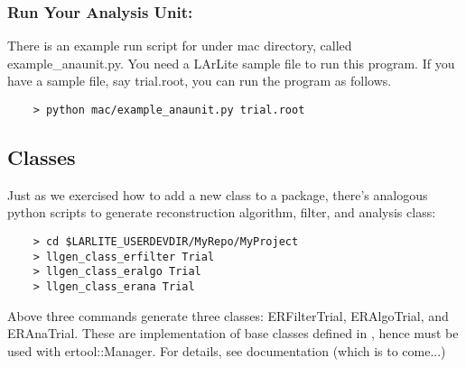 \subsubsection{Run Your Analysis Unit: \PyROOT}
\label{sec:yourrunscript}
There is an example \python run script for \anaunit under {\ttfamily mac} directory, called 
{\ttfamily example\_anaunit.py}. You need a LArLite sample \ROOT file to run this program. 
If you have a sample file, say {\ttfamily trial.root}, you can run the program as follows.
\begin{lstlisting}
    > python mac/example_anaunit.py trial.root
\end{lstlisting}

\subsection{\ertool Classes}
Just as we exercised how to add a new \CPP class to a package, there's analogous python scripts to
generate \ertool reconstruction algorithm, filter, and analysis class:
\begin{lstlisting}
    > cd $LARLITE_USERDEVDIR/MyRepo/MyProject
    > llgen_class_erfilter Trial
    > llgen_class_eralgo Trial
    > llgen_class_erana Trial
\end{lstlisting}
Above three commands generate three \CPP classes: {\ttfamily ERFilterTrial}, {\ttfamily ERAlgoTrial}, and {\ttfamily ERAnaTrial}.
These are implementation of base classes defined in \ertool, hence must be used with {\ttfamily ertool::Manager}.
For details, see \ertool documentation (which is to come...)




